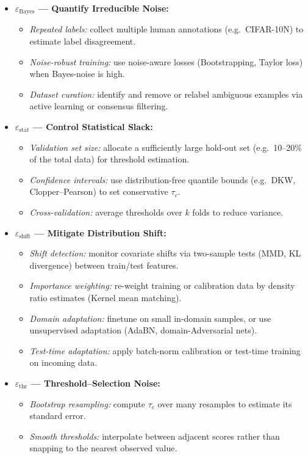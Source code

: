 \begin{itemize}[leftmargin=1.5em]
  \item \textbf{\(\varepsilon_{\text{Bayes}}\) — Quantify Irreducible Noise:}
    \begin{itemize}[leftmargin=1.25em]
      \item \emph{Repeated labels:} collect multiple human annotations (e.g.\ CIFAR-10N) to estimate label disagreement.
      \item \emph{Noise-robust training:} use noise-aware losses (Bootstrapping, Taylor loss) when Bayes-noise is high.
      \item \emph{Dataset curation:} identify and remove or relabel ambiguous examples via active learning or consensus filtering.
    \end{itemize}

  \item \textbf{\(\varepsilon_{\text{stat}}\) — Control Statistical Slack:}
    \begin{itemize}[leftmargin=1.25em]
      \item \emph{Validation set size:} allocate a sufficiently large hold-out set (e.g.\ 10–20\% of the total data) for threshold estimation.
      \item \emph{Confidence intervals:} use distribution-free quantile bounds (e.g.\ DKW, Clopper–Pearson) to set conservative \(\tau_c\).
      \item \emph{Cross-validation:} average thresholds over \(k\) folds to reduce variance.
    \end{itemize}

  \item \textbf{\(\varepsilon_{\text{shift}}\) — Mitigate Distribution Shift:}
    \begin{itemize}[leftmargin=1.25em]
      \item \emph{Shift detection:} monitor covariate shifts via two-sample tests (MMD, KL divergence) between train/test features.
      \item \emph{Importance weighting:} re-weight training or calibration data by density ratio estimates (Kernel mean matching).
      \item \emph{Domain adaptation:} finetune on small in-domain samples, or use unsupervised adaptation (AdaBN, domain-Adversarial nets).
      \item \emph{Test-time adaptation:} apply batch-norm calibration or test-time training on incoming data.
    \end{itemize}

  \item \textbf{\(\varepsilon_{\text{thr}}\) — Threshold–Selection Noise:}
    \begin{itemize}[leftmargin=1.25em]
      \item \emph{Bootstrap resampling:} compute \(\tau_c\) over many resamples to estimate its standard error.
      \item \emph{Smooth thresholds:} interpolate between adjacent scores rather than snapping to the nearest observed value.
    \end{itemize}


\end{itemize}
